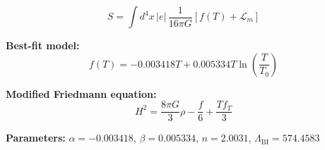 
\begin{equation}
  S = \int d^4x \, |e| \, \frac{1}{16\pi G} \left[ f(T) + \mathcal{L}_m \right]
\end{equation}

\textbf{Best-fit model:}
\begin{equation}
  f(T) = -0.003418 T + 0.005334 T \ln\!\left(\frac{T}{T_0}\right)
\end{equation}

\textbf{Modified Friedmann equation:}
\begin{equation}
  H^2 = \frac{8\pi G}{3} \rho - \frac{f}{6} + \frac{T f_T}{3}
\end{equation}

\textbf{Parameters:}
$\alpha = -0.003418$, \quad
$\beta = 0.005334$, \quad
$n = 2.0031$, \quad
$\Lambda_{\text{BI}} = 574.4583$